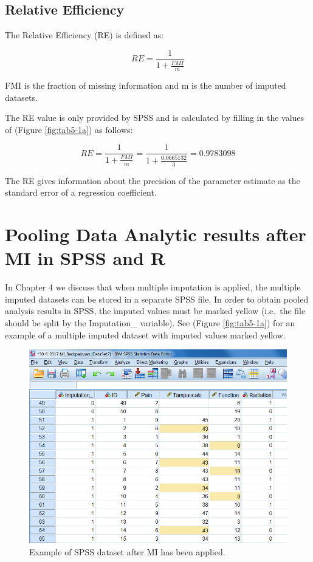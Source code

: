 \documentclass[]{book}
\theoremstyle{definition}
\theoremstyle{definition}
\theoremstyle{definition}
\theoremstyle{remark}
\begin{document}
\subsection{Relative Efficiency}\label{relative-efficiency}

The Relative Efficiency (RE) is defined as:

\begin{equation}
RE = \frac{1}{1+\frac{FMI}{m}}
  \label{eq:re}
\end{equation}

FMI is the fraction of missing information and m is the number of
imputed datasets.

The RE value is only provided by SPSS and is calculated by filling in
the values of (Figure \ref{fig:tab5-1a}) as follows:

\[RE = \frac{1}{1+\frac{FMI}{m}}=\frac{1}{1+\frac{0.0665132}{3}}=0.9783098\]

The RE gives information about the precision of the parameter estimate
as the standard error of a regression coefficient.

\section{Pooling Data Analytic results after MI in SPSS and
R}\label{pooling-data-analytic-results-after-mi-in-spss-and-r}

In Chapter 4 we discuss that when multiple imputation is applied, the
multiple imputed datasets can be stored in a separate SPSS file. In
order to obtain pooled analysis results in SPSS, the imputed values must
be marked yellow (i.e.~the file should be split by the Imputation\_
variable). See (Figure \ref{fig:tab5-1a}) for an example of a multiple
imputed dataset with imputed values marked yellow.

\begin{figure}

{\centering \includegraphics[width=0.9\linewidth]{images/fig5.1} 

}

\caption{Example of SPSS dataset after MI has been applied.}\label{fig:fig5-1}
\end{figure}
\end{document}
